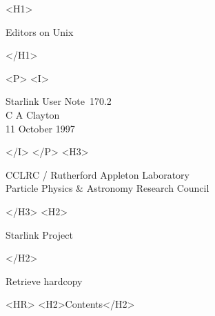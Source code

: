 \documentclass[twoside,11pt]{article}
\newcommand{\stardoccategory}  {Starlink User Note}
\newcommand{\stardocsource}    {sun\stardocnumber}
\newcommand{\stardocnumber}    {170.2}
\newcommand{\stardocauthors}   {C A Clayton}
\newcommand{\stardocdate}      {11 October 1997}
\newcommand{\stardoctitle}     {Editors on Unix}
\newcommand{\htmladdnormallink}[2]{#1}
\newcommand{\htmladdimg}[1]{}
\newcommand{\htmlref}[2]{#1}
\newcommand{\htmladdtonavigation}[1]{}
\newcommand{\xlabel}[1]{}
\begin{document}
\begin{htmlonly}
   \xlabel{}
   \begin{rawhtml} <H1> \end{rawhtml}
      \stardoctitle
   \begin{rawhtml} </H1> \end{rawhtml}


   \begin{rawhtml} <P> <I> \end{rawhtml}
   \stardoccategory\ \stardocnumber \\
   \stardocauthors \\
   \stardocdate
   \begin{rawhtml} </I> </P> <H3> \end{rawhtml}
      \htmladdnormallink{CCLRC}{http://www.cclrc.ac.uk} /
      \htmladdnormallink{Rutherford Appleton Laboratory}
                        {http://www.cclrc.ac.uk/ral} \\
      \htmladdnormallink{Particle Physics \& Astronomy Research Council}
                        {http://www.pparc.ac.uk} \\
   \begin{rawhtml} </H3> <H2> \end{rawhtml}
      \htmladdnormallink{Starlink Project}{http://www.starlink.ac.uk/}
   \begin{rawhtml} </H2> \end{rawhtml}
   \htmladdnormallink{\htmladdimg{source.gif} Retrieve hardcopy}
      {http://www.starlink.ac.uk/cgi-bin/hcserver?\stardocsource}\\

  \label{stardoccontents}
  \begin{rawhtml}
    <HR>
    <H2>Contents</H2>
  \end{rawhtml}
  \htmladdtonavigation{\htmlref{\htmladdimg{contents_motif.gif}}
        {stardoccontents}}

\end{htmlonly}
\end{document}
